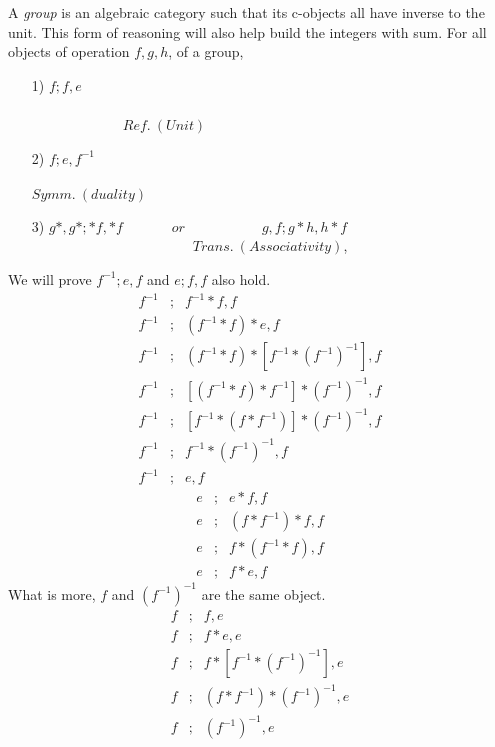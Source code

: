 \documentclass [12pt]{book}
\begin{document}
A \textit{group} is an algebraic category such that its c-objects all have inverse to the unit. This form of reasoning will also help build the integers with sum. For all objects of operation $f,g,h$, of a group,

\begin{itemize}

\item[1)]$f;f,e$~~~~~~~~~~~~~~~~~~~~~~~~~~~~~~~~~ ~~~~~~~~~~~~~~~~~~~~~~~~~~~~~~~~~~~~~~~~~~~~~~~~~~~~~~~~~
~~~~~~~~~~~~~$Ref.~(Unit)$

\item[2)] $f;e,f^{-1}$~~~~~~~~~~~~~~~~~~~~~~~~~~~~~~~~~~~~~~~~~~~~~~~
~~~~~~~~~~~~~~~~~~~~~~~~~~~~~~~~~~~~~~~~~~~~~~~~~~~~~$Symm.~(duality)$

\item[3)] $g*,g*;*f,*f$~~~~~~~$or$~~~~~~~~~~~$g,f;g*h,h*f$~~~~~~~~~~~~~~~~~~
~~~~
~~~~~~~~~~~~~~~~~~~~~~~$Trans.~(Associativity)$,

\end{itemize}We will prove $f^{-1};e,f$ and $e;f,f$ also hold.
\begin{eqnarray}\nonumber f^{-1}&;&f^{-1}*f,f\\\nonumber f^{-1}&;&(f^{-1}* f)*e,f\\\nonumber f^{-1}&;&(f^{-1}* f)* [f^{-1}*(f^{-1})^{-1}],f\\\nonumber f^{-1}&;&[(f^{-1}* f)* f^{-1}]*(f^{-1})^{-1},f\\\nonumber f^{-1}&;&[f^{-1}* (f* f^{-1})]*(f^{-1})^{-1},f\\\nonumber f^{-1}&;&f^{-1}*(f^{-1})^{-1},f\\\nonumber f^{-1}&;&e,f\end{eqnarray}
\begin{eqnarray}\nonumber e&;&e*f,f\\\nonumber e&;&(f*f^{-1})*f,f\\\nonumber e&;&f*(f^{-1}*f),f\\\nonumber e&;&f*e,f\end{eqnarray}
What is more, $f$ and $(f^{-1})^{-1}$ are the same object.
\begin{eqnarray}\nonumber f&;&f,e\\\nonumber f&;&f*e,e\\\nonumber f&;&f*[f^{-1}*(f^{-1})^{-1}],e\\\nonumber f&;&(f* f^{-1})*(f^{-1})^{-1},e\\\nonumber f&;&(f^{-1})^{-1},e\end{eqnarray}
\end{document}
